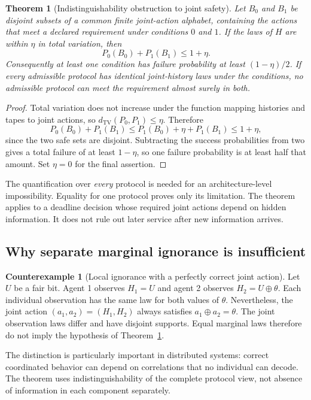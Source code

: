 \documentclass[11pt,letterpaper]{article}
\theoremstyle{plain}
\newtheorem{theorem}[proposition]{Theorem}
\theoremstyle{definition}
\newtheorem{counterexample}[proposition]{Counterexample}
\theoremstyle{remark}
\newcommand{\TV}{d_{\mathrm{TV}}}
\begin{document}
\begin{theorem}[Indistinguishability obstruction to joint safety]\label{thm:decsafe}
Let $B_0$ and $B_1$ be disjoint subsets of a common finite joint-action alphabet, containing the actions that meet a declared requirement under conditions $0$ and $1$. If the laws of $H$ are within $\eta$ in total variation, then
\[
P_0(B_0)+P_1(B_1)\leq1+\eta.
\]
Consequently at least one condition has failure probability at least $(1-\eta)/2$. If every admissible protocol has identical joint-history laws under the conditions, no admissible protocol can meet the requirement almost surely in both.
\end{theorem}
\begin{proof}
Total variation does not increase under the function mapping histories and tapes to joint actions, so $\TV(P_0,P_1)\leq\eta$. Therefore
\[
P_0(B_0)+P_1(B_1)
\leq P_1(B_0)+\eta+P_1(B_1)\leq1+\eta,
\]
since the two safe sets are disjoint. Subtracting the success probabilities from two gives a total failure of at least $1-\eta$, so one failure probability is at least half that amount. Set $\eta=0$ for the final assertion.
\end{proof}

The quantification over \emph{every} protocol is needed for an architecture-level impossibility. Equality for one protocol proves only its limitation. The theorem applies to a deadline decision whose required joint actions depend on hidden information. It does not rule out later service after new information arrives.

\subsection{Why separate marginal ignorance is insufficient}
\begin{counterexample}[Local ignorance with a perfectly correct joint action]\label{ex:jointviews}
Let $U$ be a fair bit. Agent 1 observes $H_1=U$ and agent 2 observes $H_2=U\oplus\theta$. Each individual observation has the same law for both values of $\theta$. Nevertheless, the joint action $(a_1,a_2)=(H_1,H_2)$ always satisfies $a_1\oplus a_2=\theta$. The joint observation laws differ and have disjoint supports. Equal marginal laws therefore do not imply the hypothesis of Theorem~\ref{thm:decsafe}.
\end{counterexample}

The distinction is particularly important in distributed systems: correct coordinated behavior can depend on correlations that no individual can decode. The theorem uses indistinguishability of the complete protocol view, not absence of information in each component separately.
\end{document}
